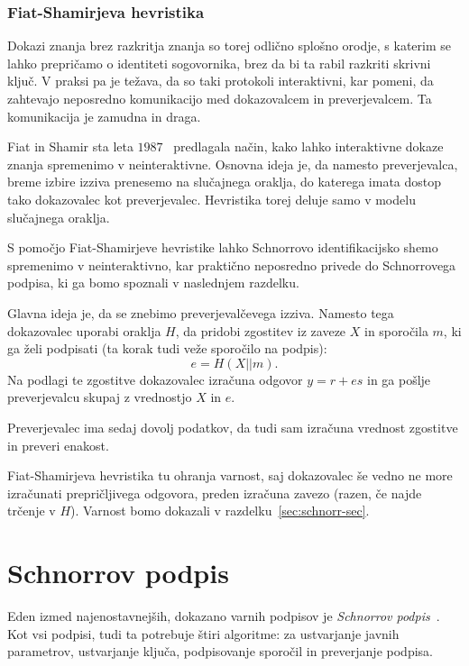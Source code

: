 \documentclass[isrm2, tisk]{fmfdelo}
\begin{document}
\subsubsection{Fiat-Shamirjeva hevristika}
\label{sec:fiat-shamir}
Dokazi znanja brez razkritja znanja so torej odlično splošno orodje, s katerim se lahko prepričamo
o identiteti sogovornika, brez da bi ta rabil razkriti skrivni ključ. V praksi pa je težava, da so
taki protokoli interaktivni, kar pomeni, da zahtevajo neposredno komunikacijo med dokazovalcem in
preverjevalcem. Ta komunikacija je zamudna in draga.

Fiat in Shamir sta leta $1987$~\cite{fiat1987heuristic} predlagala način, kako lahko interaktivne
dokaze znanja spremenimo v neinteraktivne. Osnovna ideja je, da namesto preverjevalca, breme izbire
izziva prenesemo na slučajnega oraklja, do katerega imata dostop tako dokazovalec kot preverjevalec.
Hevristika torej deluje samo v modelu slučajnega oraklja.

\begin{primer}
\label{primer:fiat-shamir}
    S pomočjo Fiat-Shamirjeve hevristike lahko Schnorrovo identifikacijsko shemo spremenimo v
    neinteraktivno, kar praktično neposredno privede do Schnorrovega podpisa, ki ga bomo spoznali
    v naslednjem razdelku.

    Glavna ideja je, da se znebimo preverjevalčevega izziva. Namesto tega dokazovalec uporabi
    oraklja $H$, da pridobi zgostitev iz zaveze $X$ in sporočila $m$, ki ga želi podpisati (ta
    korak tudi veže sporočilo na podpis):
    $$
    e = H(X || m).
    $$
    Na podlagi te zgostitve dokazovalec izračuna odgovor $y = r + es$ in ga pošlje preverjevalcu
    skupaj z vrednostjo $X$ in $e$.

    Preverjevalec ima sedaj dovolj podatkov, da tudi sam izračuna vrednost zgostitve in preveri
    enakost.

    Fiat-Shamirjeva hevristika tu ohranja varnost, saj dokazovalec še vedno ne more izračunati
    prepričljivega odgovora, preden izračuna zavezo (razen, če najde trčenje v $H$). Varnost bomo
    dokazali v razdelku~\ref{sec:schnorr-sec}.
\end{primer}

\section{Schnorrov podpis}
\label{sec:schnorr}
Eden izmed najenostavnejših, dokazano varnih podpisov je \textit{Schnorrov podpis}~\cite{schnorr1989sig}.
Kot vsi podpisi, tudi ta potrebuje štiri algoritme: za ustvarjanje javnih parametrov, ustvarjanje ključa, 
podpisovanje sporočil in preverjanje podpisa.
\end{document}
